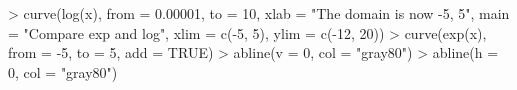 \begin{Schunk}
\begin{Sinput}
> curve(log(x), from = 0.00001, to = 10, xlab = "The domain is now -5, 5", main = "Compare exp and log", xlim = c(-5, 5), ylim = c(-12, 20))
> curve(exp(x), from = -5, to = 5, add = TRUE)
> abline(v = 0, col = "gray80")
> abline(h = 0, col = "gray80")
\end{Sinput}
\end{Schunk}
